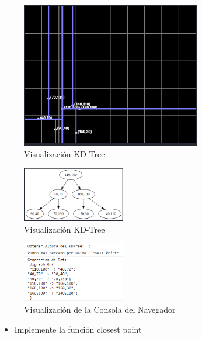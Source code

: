 \documentclass{article}
\begin{document}
\begin{enumerate}
\begin{figure}[H]
\centering
\includegraphics[width=0.7\textwidth]{Img/prueba2.1.png}
\caption{Visualización KD-Tree}
\end{figure}

\begin{figure}[H]
\centering
\includegraphics[width=0.4\textwidth]{Img/prueba2.2.png}
\caption{Visualización KD-Tree}
\end{figure}

\begin{figure}[H]
\centering
\includegraphics[width=0.4\textwidth]{Img/prueba2.3.png}
\caption{Visualización de la Consola del Navegador}
\end{figure}

\begin{itemize}
   \item Implemente la función closest point
\end{itemize}


\end{enumerate}
\end{document}
